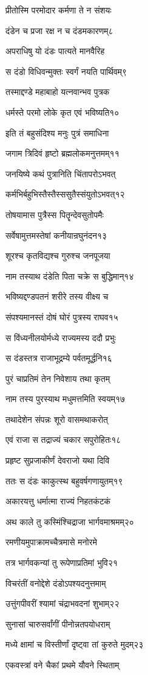 प्रीतोस्मि परमोदार कर्मणा ते न संशयः

दंडेन च प्रजा रक्ष न च दंडमकारणम्८

अपराधिषु यो दंडः पात्यते मानवैरिह

स दंडो विधिवन्मुक्तः स्वर्गं नयति पार्थिवम्९

तस्माद्दण्डे महाबाहो यत्नवान्भव पुत्रक

धर्मस्ते परमो लोके कृत एवं भविष्यति१०

इति तं बहुसंदिश्य मनुः पुत्रं समाधिना

जगाम त्रिदिवं हृष्टो ब्रह्मलोकमनुत्तमम्११

जनयिष्ये कथं पुत्रानिति चिंतापरोऽभवत्

कर्मभिर्बहुभिस्तैस्तैस्ससुतैस्संयुतोऽभवत्१२

तोषयामास पुत्रैस्स पितॄन्देवसुतोपमैः

सर्वेषामुत्तमस्तेषां कनीयान्रघुनंदन१३

शूरश्च कृतविद्यश्च गुरुश्च जनपूजया

नाम तस्याथ दंडेति पिता चक्रे स बुद्धिमान्१४

भविष्यद्दण्डपतनं शरीरे तस्य वीक्ष्य च

संपश्यमानस्तं दोषं घोरं पुत्रस्य राघव१५

स विंध्यनीलयोर्मध्ये राज्यमस्य ददौ प्रभुः

स दंडस्तत्र राजाभूद्रम्ये पर्वतमूर्द्धनि१६

पुरं चाप्रतिमं तेन निवेशाय तथा कृतम्

नाम तस्य पुरस्याथ मधुमत्तमिति स्वयम्१७

तथादेशेन संपन्नः शूरो वासमथाकरोत्

एवं राजा स तद्राज्यं चकार सपुरोहितः१८

प्रहृष्ट सुप्रजाकीर्णं देवराजो यथा दिवि

ततः स दंडः काकुत्स्थ बहुवर्षगणायुतम्१९

अकारयत्तु धर्मात्मा राज्यं निहतकंटकं

अथ काले तु कस्मिंश्चिद्राजा भार्गवमाश्रमम्२०

रमणीयमुपाक्रामच्चैत्रमासे मनोरमे

तत्र भार्गवकन्यां तु रूपेणाप्रतिमां भुवि२१

विचरंतीं वनोद्देशे दंडोऽपश्यदनुत्तमाम्

उत्तुंगपीवरीं श्यामां चंद्राभवदनां शुभाम्२२

सुनासां चारुसर्वांगीं पीनोन्नतपयोधराम्

मध्ये क्षामां च विस्तीर्णां दृष्ट्वा तां कुरुते मुदम्२३

एकवस्त्रां वने चैकां प्रथमे यौवने स्थिताम्

